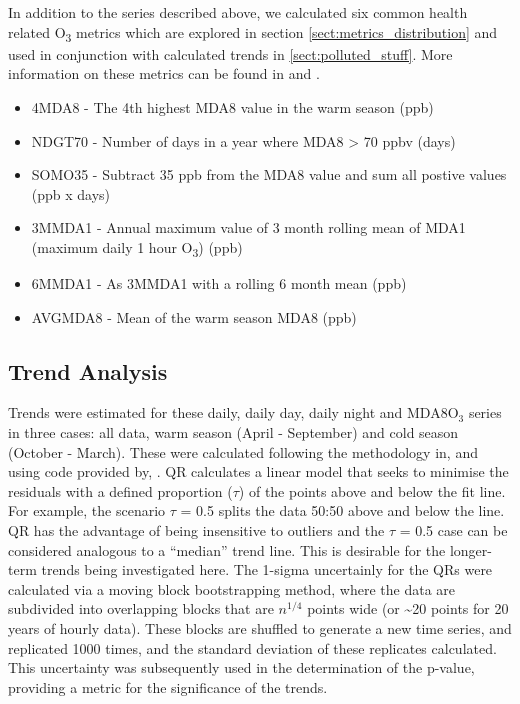 \documentclass[journal abbreviation, manuscript]{copernicus}
\begin{document}
In addition to the series described above, we calculated six common health related O\textsubscript{3} metrics which are explored in section \ref{sect:metrics_distribution} and used in conjunction with calculated trends in \ref{sect:polluted_stuff}. More information on these metrics can be found in \cite{10.1525/elementa.279} and \cite{fleming_2018}.

\begin{itemize}
    \item 4MDA8 - The 4th highest MDA8 value in the warm season (ppb)
    \item NDGT70 - Number of days in a year where MDA8 > 70 ppbv (days)
    \item SOMO35 - Subtract 35 ppb from the MDA8 value and sum all postive values (ppb x days)
    \item 3MMDA1 - Annual maximum value of 3 month rolling mean of MDA1 (maximum daily 1 hour O\textsubscript{3}) (ppb)
    \item 6MMDA1 - As 3MMDA1 with a rolling 6 month mean (ppb)
    \item AVGMDA8 - Mean of the warm season MDA8 (ppb)
\end{itemize}


\subsection{Trend Analysis}
Trends were estimated for these daily, daily day, daily night and MDA8O$_3$ series in three cases: all data, warm season (April - September) and cold season (October - March). These were calculated following the methodology in, and using code provided by, \cite{chang2023guidancenotebeststatistical}. QR calculates a linear model that seeks to minimise the residuals with a defined proportion ($\tau$) of the points above and below the fit line. For example, the scenario $\tau$ = 0.5 splits the data 50:50 above and below the line. QR has the advantage of being insensitive to outliers and the $\tau$ = 0.5 case can be considered analogous to a “median” trend line. This is desirable for the longer-term trends being investigated here. The 1-sigma uncertainly for the QRs were calculated via a moving block bootstrapping method, where the data are subdivided into overlapping blocks that are $n^{1/4}$ points wide (or \textasciitilde{20} points for 20 years of hourly data). These blocks are shuffled to generate a new time series, and replicated 1000 times, and the standard deviation of these replicates calculated. This uncertainty was subsequently used in the determination of the p-value, providing a metric for the significance of the trends. 
\end{document}
